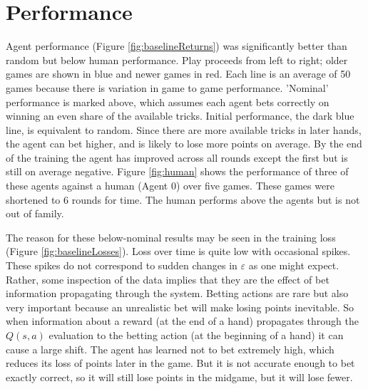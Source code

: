\documentclass[10pt]{article} %
\begin{document}
\section{Performance}

\newcommand{\plotrun}[3]{
\begin{figure}[h!]
\centering
\addtolength{\leftskip}{-1.5cm}
\addtolength{\rightskip}{-1.5cm}
\subfloat[Agent Training Loss\label{fig:#3Losses}]{ \texttt{[image: ../../runs/\#1/training\_losses.png]} }
\hfill
\subfloat[Agent Performance\label{fig:#3Returns}]{ \texttt{[image: ../../runs/\#1/training\_returns.png]} }
\caption{#2} \label{fig:#3}
\end{figure}
}

Agent performance (Figure \ref{fig:baselineReturns}) was significantly better than random but below human performance. Play proceeds from left to right; older games are shown in blue and newer games in red. Each line is an average of 50 games because there is variation in game to game performance. 'Nominal' performance is marked above, which assumes each agent bets correctly on winning an even share of the available tricks. Initial performance, the dark blue line, is equivalent to random. Since there are more available tricks in later hands, the agent can bet higher, and is likely to lose more points on average. By the end of the training the agent has improved across all rounds except the first but is still on average negative. Figure \ref{fig:human} shows the performance of three of these agents against a human (Agent 0) over five games. These games were shortened to 6 rounds for time. The human performs above the agents but is not out of family.

The reason for these below-nominal results may be seen in the training loss (Figure \ref{fig:baselineLosses}). Loss over time is quite low with occasional spikes. These spikes do not correspond to sudden changes in $\varepsilon$ as one might expect. Rather, some inspection of the data implies that they are the effect of bet information propagating through the system. Betting actions are rare but also very important because an unrealistic bet will make losing points inevitable. So when information about a reward (at the end of a hand) propagates through the $Q(s,a)$ evaluation to the betting action (at the beginning of a hand) it can cause a large shift. The agent has learned not to bet extremely high, which reduces its loss of points later in the game. But it is not accurate enough to bet exactly correct, so it will still lose points in the midgame, but it will lose fewer.
\end{document}

